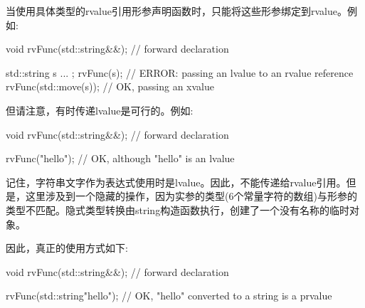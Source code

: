 当使用具体类型的rvalue引用形参声明函数时，只能将这些形参绑定到rvalue。例如:

\begin{cppcode}
void rvFunc(std::string&&); // forward declaration

std::string s{ ... };
rvFunc(s); // ERROR: passing an lvalue to an rvalue reference
rvFunc(std::move(s)); // OK, passing an xvalue
\end{cppcode}

但请注意，有时传递lvalue是可行的。例如:

\begin{cppcode}
void rvFunc(std::string&&); // forward declaration

rvFunc("hello"); // OK, although "hello" is an lvalue
\end{cppcode}

记住，字符串文字作为表达式使用时是lvalue。因此，不能传递给rvalue引用。但是，这里涉及到一个隐藏的操作，因为实参的类型(6个常量字符的数组)与形参的类型不匹配。隐式类型转换由string构造函数执行，创建了一个没有名称的临时对象。

因此，真正的使用方式如下:

\begin{cppcode}
void rvFunc(std::string&&); // forward declaration

rvFunc(std::string{"hello"}); // OK, "hello" converted to a string is a prvalue
\end{cppcode}































































